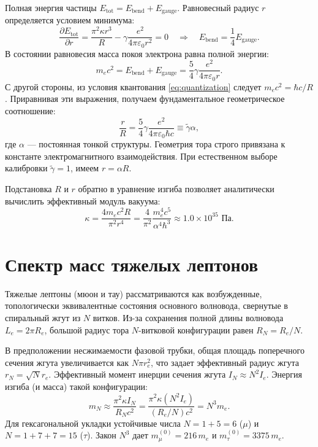 \documentclass[12pt,a4paper]{article}
\begin{document}
Полная энергия частицы $E_{\text{tot}} = E_{\text{bend}} + E_{\text{gauge}}$. Равновесный радиус $r$ определяется условием минимума:
\begin{equation}
\frac{\partial E_{\text{tot}}}{\partial r} = \frac{\pi^2 \kappa r^3}{R} - \gamma \frac{e^2}{4\pi\varepsilon_0 r^2} = 0 \quad \Longrightarrow \quad E_{\text{bend}} = \frac{1}{4} E_{\text{gauge}}.
\label{eq:minimization}
\end{equation}
В состоянии равновесия масса покоя электрона равна полной энергии:
\begin{equation}
m_e c^2 = E_{\text{bend}} + E_{\text{gauge}} = \frac{5}{4} \gamma \frac{e^2}{4\pi\varepsilon_0 r}.
\label{eq:mass_equilibrium}
\end{equation}
С другой стороны, из условия квантования \eqref{eq:quantization} следует $m_e c^2 = \hbar c / R$. Приравнивая эти выражения, получаем фундаментальное геометрическое соотношение:
\begin{equation}
\frac{r}{R} = \frac{5}{4}\gamma \frac{e^2}{4\pi\varepsilon_0 \hbar c} \equiv \tilde{\gamma} \alpha,
\label{eq:alpha_derivation}
\end{equation}
где $\alpha$ — постоянная тонкой структуры. Геометрия тора строго привязана к константе электромагнитного взаимодействия. При естественном выборе калибровки $\tilde{\gamma} = 1$, имеем $r = \alpha R$.

Подстановка $R$ и $r$ обратно в уравнение изгиба позволяет аналитически вычислить эффективный модуль вакуума:
\begin{equation}
\kappa = \frac{4 m_e c^2 R}{\pi^2 r^4} = \frac{4}{\pi^2} \frac{m_e^4 c^5}{\alpha^4 \hbar^3} \approx 1.0 \times 10^{35} \text{ Па}.
\label{eq:kappa_val}
\end{equation}

\section{Спектр масс тяжелых лептонов}

Тяжелые лептоны (мюон и тау) рассматриваются как возбужденные, топологически эквивалентные состояния основного волновода, свернутые в спиральный жгут из $N$ витков. Из-за сохранения полной длины волновода $L_e = 2\pi R_e$, большой радиус тора $N$-витковой конфигурации равен $R_N = R_e/N$.

В предположении несжимаемости фазовой трубки, общая площадь поперечного сечения жгута увеличивается как $N \pi r_e^2$, что задает эффективный радиус жгута $r_N = \sqrt{N} r_e$. Эффективный момент инерции сечения жгута $I_N \approx N^2 I_e$. Энергия изгиба (и масса) такой конфигурации:
\begin{equation}
m_N \approx \frac{\pi^2 \kappa I_N}{R_N c^2} = \frac{\pi^2 \kappa (N^2 I_e)}{(R_e/N) c^2} = N^3 m_e.
\label{eq:mass_cubed}
\end{equation}
Для гексагональной укладки устойчивые числа $N = 1+5 = 6$ ($\mu$) и $N = 1+7+7 = 15$ ($\tau$). Закон $N^3$ дает $m_\mu^{(0)} = 216\,m_e$ и $m_\tau^{(0)} = 3375\,m_e$.
\end{document}
